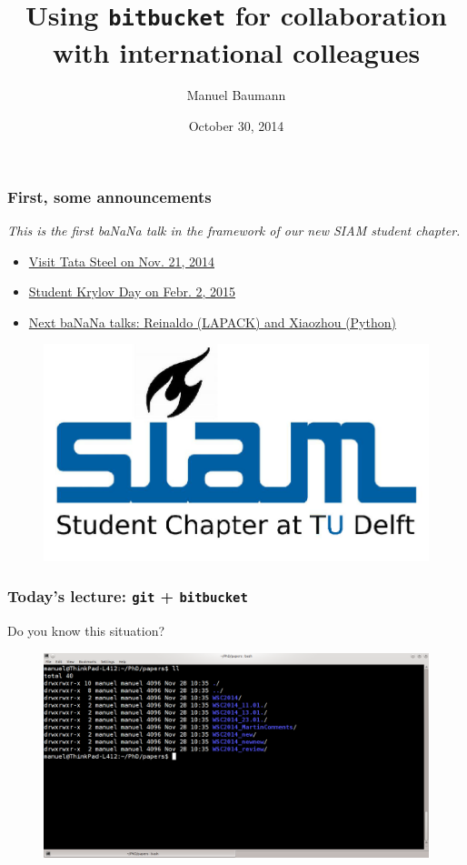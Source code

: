 \documentclass{beamer}
\title{\huge{Using \texttt{bitbucket} for collaboration with international colleagues}}
\author{Manuel Baumann}
\date{\footnotesize{October 30, 2014}}
\begin{document}
\frame{
\titlepage
}

\begin{frame}
\frametitle{First, some announcements}
\vspace{1cm}
\textit{This is the first ba\color{red}NaN\color{black}a talk in the framework of our new SIAM student chapter.}
\begin{itemize}
 \item \href{http://sscdelft.github.io/activities/2014/11/21/visit-tata-steel.html}{Visit Tata Steel on Nov. 21, 2014}
 \pause
 \item \href{http://sscdelft.github.io/activities/2015/02/02/krylov-day.html}{Student Krylov Day on Febr. 2, 2015}
 \pause
 \item \href{http://projectbanana.github.io/}{Next ba\color{red}NaN\color{black}a talks: Reinaldo (LAPACK) and Xiaozhou (Python)}
\end{itemize}
\begin{figure}
\hfill \includegraphics[scale=0.12]{images/SSC_Delft_new}
\end{figure}

\end{frame}

\begin{frame}
\frametitle{Today's lecture: \texttt{git} + \texttt{bitbucket}}
Do you know this situation?
\begin{figure}
\centering
 \includegraphics[height=0.6\textheight]{images/screnshot1.png}
\end{figure}
\end{frame}
\end{document}
